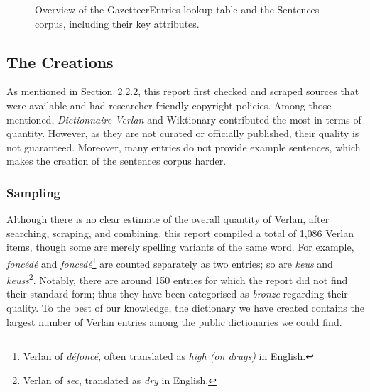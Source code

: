 \documentclass[12pt]{article}
\begin{document}
\begin{figure}[p]
\caption{\label{fig:dataset-structure}Overview of the GazetteerEntries lookup table and the Sentences corpus, including their key attributes.}
\end{figure}


\subsection{The Creations}

As mentioned in Section~2.2.2, this report first checked and scraped sources that were available and had researcher-friendly copyright policies. Among those mentioned, \textit{Dictionnaire Verlan} and Wiktionary contributed the most in terms of quantity. However, as they are not curated or officially published, their quality is not guaranteed. Moreover, many entries do not provide example sentences, which makes the creation of the sentences corpus harder.

\subsubsection{Sampling}
Although there is no clear estimate of the overall quantity of Verlan, after searching, scraping, and combining, this report compiled a total of 1{,}086 Verlan items, though some are merely spelling variants of the same word. For example, \textit{foncédé} and \textit{foncedé}\footnote{Verlan of \textit{défoncé}, often translated as \textit{high (on drugs)} in English.} are counted separately as two entries; so are \textit{keus} and \textit{keuss}\footnote{Verlan of \textit{sec}, translated as \textit{dry} in English.}. Notably, there are around 150 entries for which the report did not find their standard form; thus they have been categorised as \textit{bronze} regarding their quality. To the best of our knowledge, the dictionary we have created contains the largest number of Verlan entries among the public dictionaries we could find.
\end{document}
